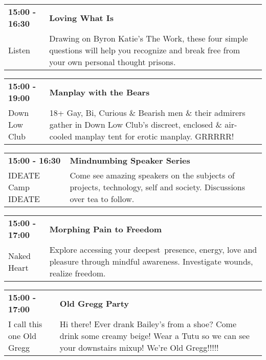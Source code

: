 \begin{tabular}{ p{1in} p{2.2in} }
    \textbf{15:00 - 16:30} & \textbf{Loving What Is} \\
    Listen \newline  & Drawing on Byron Katie's The Work, these four simple questions will help you recognize and break free from your own personal thought prisons. \\
    \hline 
\end{tabular}
    
\begin{tabular}{ p{1in} p{2.2in} }
    \textbf{15:00 - 19:00} & \textbf{Manplay with the Bears} \\
    Down Low Club \newline  & 18+ Gay, Bi, Curious \& Bearish men \& their admirers gather in Down Low Club's discreet, enclosed \& air-cooled manplay tent for erotic manplay. GRRRRR! \\
    \hline 
\end{tabular}
    
\begin{tabular}{ p{1in} p{2.2in} }
    \textbf{15:00 - 16:30} & \textbf{ Mindnumbing Speaker Series} \\
    IDEATE \newline Camp IDEATE & Come see amazing speakers on the subjects of projects, technology, self and society. Discussions over tea to follow. \\
    \hline 
\end{tabular}
    
\begin{tabular}{ p{1in} p{2.2in} }
    \textbf{15:00 - 17:00} & \textbf{Morphing Pain to Freedom} \\
    Naked Heart \newline  & Explore accessing your deepest~presence, energy, love and pleasure through mindful awareness. Investigate wounds, realize freedom. \\
    \hline 
\end{tabular}
    
\begin{tabular}{ p{1in} p{2.2in} }
    \textbf{15:00 - 17:00} & \textbf{Old Gregg Party} \\
    I call this one Old Gregg \newline  & Hi there! 
Ever drank Bailey's from a shoe?
Come drink some creamy beige! 
Wear a Tutu so we can see your downstairs mixup!
We're Old Gregg!!!!! \\
    \hline 
\end{tabular}
    
